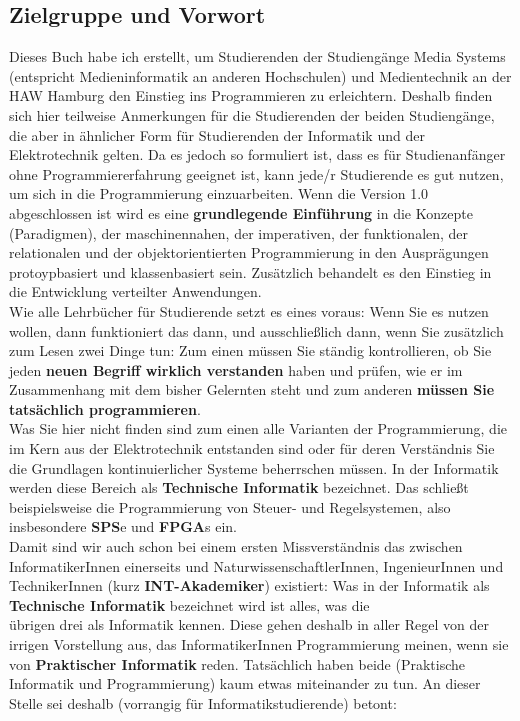 
\subsection*{Zielgruppe und Vorwort}

Dieses Buch habe ich erstellt, um Studierenden der Studiengänge Media Systems (entspricht Medieninformatik an anderen Hochschulen) und Medientechnik an der HAW Hamburg den Einstieg ins Programmieren zu erleichtern. Deshalb finden sich hier teilweise Anmerkungen für die Studierenden der beiden Studiengänge, die aber in ähnlicher Form für Studierenden der Informatik und der Elektrotechnik gelten. Da es jedoch so formuliert ist, dass es für Studienanfänger ohne Programmiererfahrung geeignet ist, kann jede/r Studierende es gut nutzen, um sich in die Programmierung einzuarbeiten. Wenn die Version 1.0 abgeschlossen ist wird es eine \textbf{grundlegende Einführung} in die Konzepte (Paradigmen), der maschinennahen, der imperativen, der funktionalen, der relationalen und der objektorientierten Programmierung in den Ausprägungen protoypbasiert und klassenbasiert sein. Zusätzlich behandelt es den Einstieg in die Entwicklung verteilter Anwendungen.\\

Wie alle Lehrbücher für Studierende setzt es eines voraus: Wenn Sie es nutzen wollen, dann funktioniert das dann, und ausschließlich dann, wenn Sie zusätzlich zum Lesen zwei Dinge tun: Zum einen müssen Sie ständig kontrollieren, ob Sie jeden \textbf{neuen Begriff wirklich verstanden} haben und prüfen, wie er im Zusammenhang mit dem bisher Gelernten steht und zum anderen \textbf{müssen Sie tatsächlich programmieren}.\\

Was Sie hier nicht finden sind zum einen alle Varianten der Programmierung, die im Kern aus der Elektrotechnik entstanden sind oder für deren Verständnis Sie die Grundlagen kontinuierlicher Systeme beherrschen müssen. In der Informatik werden diese Bereich als \textbf{Technische Informatik} bezeichnet. Das schließt beispielsweise die Programmierung von Steuer- und Regelsystemen, also insbesondere \textbf{SPS}e und \textbf{FPGA}s ein.\\

Damit sind wir auch schon bei einem ersten Missverständnis das zwischen InformatikerInnen einerseits und NaturwissenschaftlerInnen, IngenieurInnen und TechnikerInnen (kurz \textbf{INT-Akademiker}) existiert: Was in der Informatik als \textbf{Technische Informatik} bezeichnet wird ist alles, was die\\
übrigen drei als Informatik kennen. Diese gehen deshalb in aller Regel von der irrigen Vorstellung aus, das InformatikerInnen Programmierung meinen, wenn sie von \textbf{Praktischer Informatik} reden. Tatsächlich haben beide (Praktische Informatik und Programmierung) kaum etwas miteinander zu tun. An dieser Stelle sei deshalb (vorrangig für Informatikstudierende) betont:\\

